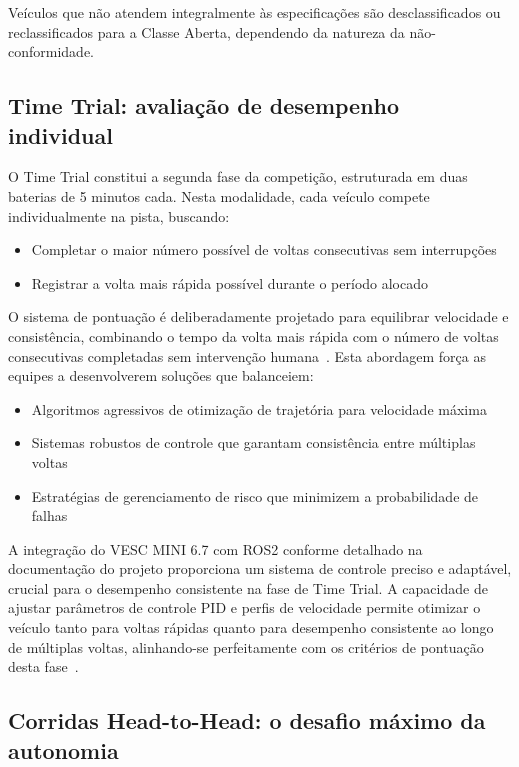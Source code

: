 Veículos que não atendem integralmente às especificações são desclassificados
ou reclassificados para a Classe Aberta, dependendo da natureza da
não-conformidade.

\subsection{Time Trial: avaliação de desempenho individual}

O Time Trial constitui a segunda fase da competição, estruturada em duas
baterias de 5 minutos cada. Nesta modalidade, cada veículo compete
individualmente na pista, buscando:

\begin{itemize}
      \item Completar o maior número possível de voltas consecutivas sem interrupções
      \item Registrar a volta mais rápida possível durante o período alocado
\end{itemize}

O sistema de pontuação é deliberadamente projetado para equilibrar velocidade e
consistência, combinando o tempo da volta mais rápida com o número de voltas
consecutivas completadas sem intervenção humana~\cite{ShinF1TENTH2020}. Esta
abordagem força as equipes a desenvolverem soluções que balanceiem:

\begin{itemize}
      \item Algoritmos agressivos de otimização de trajetória para velocidade máxima
      \item Sistemas robustos de controle que garantam consistência entre múltiplas voltas
      \item Estratégias de gerenciamento de risco que minimizem a probabilidade de falhas
\end{itemize}

A integração do VESC MINI 6.7 com ROS2 conforme detalhado na documentação do
projeto proporciona um sistema de controle preciso e adaptável, crucial para o
desempenho consistente na fase de Time Trial. A capacidade de ajustar
parâmetros de controle PID e perfis de velocidade permite otimizar o veículo
tanto para voltas rápidas quanto para desempenho consistente ao longo de
múltiplas voltas, alinhando-se perfeitamente com os critérios de pontuação
desta fase~\cite{ShinF1TENTH2020}.

\subsection{Corridas Head-to-Head: o desafio máximo da autonomia}

